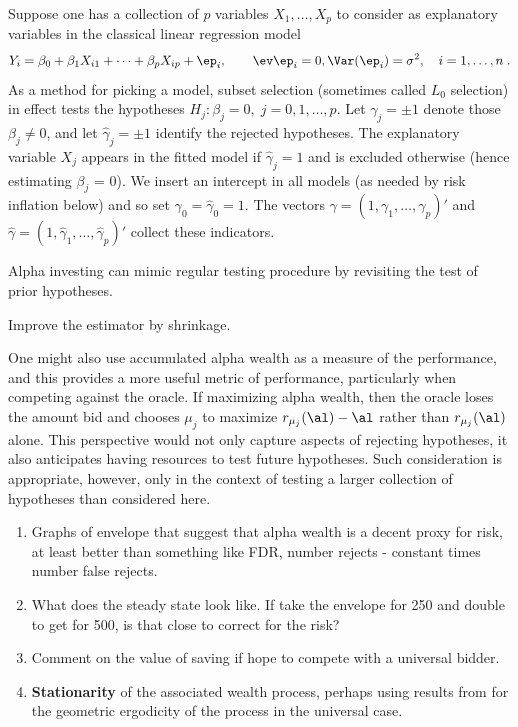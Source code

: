 \documentclass[12pt]{article}
\begin{document}
  Suppose one has a collection of $p$ variables $X_1, \ldots, X_p$ to consider as
 explanatory variables in the classical linear regression model
 \begin{equation}
   Y_i = \beta_0 + \beta_1 X_{i1} + \cdots + \beta_p X_{ip} + \ep_i, 
     \qquad \ev \ep_i = 0, \Var(\ep_i)=\sigma^2,  \quad i = 1,\ldots,n\;.
 \label{eq:regr}
 \end{equation}
 As a method for picking a model, subset selection (sometimes called $L_0$
 selection) in effect tests the hypotheses $H_j: \beta_j = 0, \; j = 0, 1, \ldots, p$.
  Let $\gamma_j = \pm 1$ denote those $\beta_j \ne 0$, and let $\hat\gamma_j =
 \pm 1$ identify the rejected hypotheses.  The explanatory variable $X_j$
 appears in the fitted model if $\hat\gamma_j = 1$ and is excluded otherwise
 (hence estimating $\beta_j$ = 0).  We insert an intercept in all models (as
 needed by risk inflation below) and so set $\gamma_0=\hat\gamma_0 = 1$.  The
 vectors $\gamma = (1, \gamma_1, \ldots, \gamma_p)'$ and $\hat\gamma = (1,
 \hat\gamma_1, \ldots, \hat\gamma_p)'$ collect these indicators.


Alpha investing can mimic regular testing procedure by revisiting the test of
prior hypotheses. 

Improve the estimator by shrinkage.



 One might also use accumulated alpha wealth as a measure of the performance, and
 this provides a more useful metric of performance, particularly when competing
 against the oracle.  If maximizing alpha wealth, then the oracle loses the
 amount bid and chooses $\mu_j$ to maximize $r_{\mu_j}(\al)-\al$ rather than
 $r_{\mu_j}(\al)$ alone.  This perspective would not only capture aspects of
 rejecting hypotheses, it also anticipates having resources to test future
 hypotheses.  Such consideration is appropriate, however, only in the context of
 testing a larger collection of hypotheses than considered here.

 \begin{enumerate}

 \item Graphs of envelope that suggest that alpha wealth is a decent proxy for
 risk, at least better than something like FDR, number rejects - constant times
 number false rejects.

 \item What does the steady state look like.  If take the envelope for 250 and
 double to get for 500, is that close to correct for the risk?

 \item Comment on the value of saving if hope to compete with a universal
 bidder.
 
\item {\bf Stationarity} of the associated wealth process, perhaps using results
 from \citet{chanTong94} for the geometric ergodicity of the process in the
 universal case.

\end{enumerate}
\end{document}
